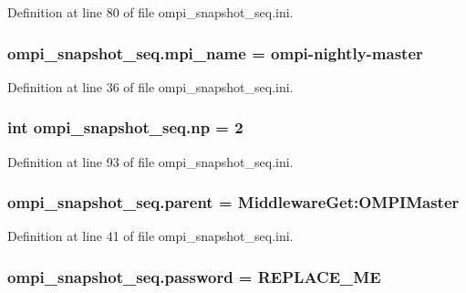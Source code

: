 Definition at line 80 of file ompi\-\_\-snapshot\-\_\-seq.\-ini.

\hypertarget{namespaceompi__snapshot__seq_a464fbb2313394347fa064032378c5674}{
\subsubsection[{mpi\-\_\-name}]{\setlength{\rightskip}{0pt plus 5cm}ompi\-\_\-snapshot\-\_\-seq.\-mpi\-\_\-name = ompi-\/nightly-\/master}}\label{namespaceompi__snapshot__seq_a464fbb2313394347fa064032378c5674}


Definition at line 36 of file ompi\-\_\-snapshot\-\_\-seq.\-ini.

\hypertarget{namespaceompi__snapshot__seq_ac5c6ca602093f9742f1afbfc100f8cfd}{
\subsubsection[{np}]{\setlength{\rightskip}{0pt plus 5cm}int ompi\-\_\-snapshot\-\_\-seq.\-np = 2}}\label{namespaceompi__snapshot__seq_ac5c6ca602093f9742f1afbfc100f8cfd}


Definition at line 93 of file ompi\-\_\-snapshot\-\_\-seq.\-ini.

\hypertarget{namespaceompi__snapshot__seq_a08a86b12770df9f65150ce521c8820b6}{
\subsubsection[{parent}]{\setlength{\rightskip}{0pt plus 5cm}ompi\-\_\-snapshot\-\_\-seq.\-parent = Middleware\-Get\-:\-O\-M\-P\-I\-Master}}\label{namespaceompi__snapshot__seq_a08a86b12770df9f65150ce521c8820b6}


Definition at line 41 of file ompi\-\_\-snapshot\-\_\-seq.\-ini.

\hypertarget{namespaceompi__snapshot__seq_a6229810db63f8ab2e0598c9dc5da7a32}{
\subsubsection[{password}]{\setlength{\rightskip}{0pt plus 5cm}ompi\-\_\-snapshot\-\_\-seq.\-password = R\-E\-P\-L\-A\-C\-E\-\_\-\-M\-E}}\label{namespaceompi__snapshot__seq_a6229810db63f8ab2e0598c9dc5da7a32}


